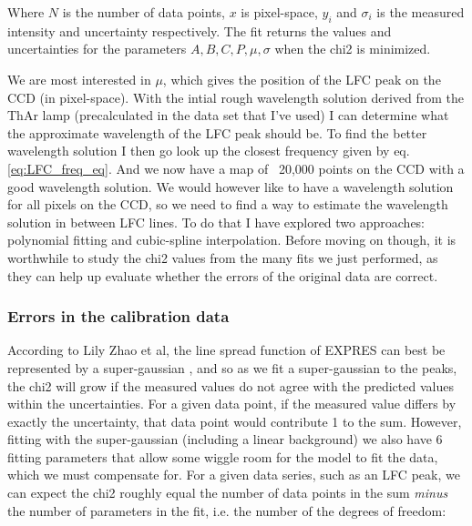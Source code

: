     Where $N$ is the number of data points, $x$ is pixel-space, $y_i$ and $\sigma_i$ is the measured intensity and uncertainty respectively. The fit returns the values and uncertainties for the parameters $A, B, C, P, \mu, \sigma$ when the chi2 is minimized.
    
    We are most interested in $\mu$, which gives the position of the LFC peak on the CCD (in pixel-space). With the intial rough wavelength solution derived from the ThAr lamp (precalculated in the data set that I've used) I can determine what the approximate wavelength of the LFC peak should be. To find the better wavelength solution I then go look up the closest frequency given by eq. \ref{eq:LFC_freq_eq}. And we now have a map of ~20,000 points on the CCD with a good wavelength solution. We would however like to have a wavelength solution for all pixels on the CCD, so we need to find a way to estimate the wavelength solution in between LFC lines. To do that I have explored two approaches: polynomial fitting and cubic-spline interpolation. Before moving on though, it is worthwhile to study the chi2 values from the many fits we just performed, as they can help up evaluate whether the errors of the original data are correct.
    
    \subsubsection{Errors in the calibration data}

    According to Lily Zhao et al, the line spread function of EXPRES can best be represented by a super-gaussian \cite{yale_data}, and so as we fit a super-gaussian to the peaks, the chi2 will grow if the measured values do not agree with the predicted values within the uncertainties. For a given data point, if the measured value differs by exactly the uncertainty, that data point would contribute 1 to the sum. However, fitting with the super-gaussian (including a linear background) we also have 6 fitting parameters that allow some wiggle room for the model to fit the data, which we must compensate for. For a given data series, such as an LFC peak, we can expect the chi2 roughly equal the number of data points in the sum \emph{minus} the number of parameters in the fit, i.e. the number of the degrees of freedom:
    

